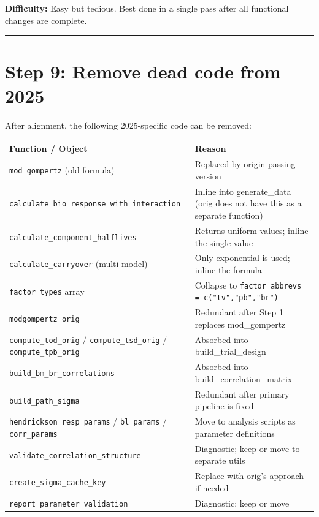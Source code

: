 \documentclass[11pt]{article}
\begin{document}
\textbf{Difficulty:} Easy but tedious. Best done in a single pass after
all functional changes are complete.

\bigskip\noindent\rule{\textwidth}{0.4pt}\bigskip

\section{Step 9: Remove dead code from 2025}

After alignment, the following 2025-specific code can be removed:

\begin{table}[h]
\centering
\small
\begin{tabular}{lp{8cm}}
\toprule
Function / Object & Reason \\
\midrule
\texttt{mod\_gompertz} (old formula) & Replaced by origin-passing version \\
\texttt{calculate\_bio\_response\_with\_interaction} & Inline into generate\_data (orig does not have this as a separate function) \\
\texttt{calculate\_component\_halflives} & Returns uniform values; inline the single value \\
\texttt{calculate\_carryover} (multi-model) & Only exponential is used; inline the formula \\
\texttt{factor\_types} array & Collapse to \texttt{factor\_abbrevs = c("tv","pb","br")} \\
\texttt{modgompertz\_orig} & Redundant after Step 1 replaces mod\_gompertz \\
\texttt{compute\_tod\_orig} / \texttt{compute\_tsd\_orig} / \texttt{compute\_tpb\_orig} & Absorbed into build\_trial\_design \\
\texttt{build\_bm\_br\_correlations} & Absorbed into build\_correlation\_matrix \\
\texttt{build\_path\_sigma} & Redundant after primary pipeline is fixed \\
\texttt{hendrickson\_resp\_params} / \texttt{bl\_params} / \texttt{corr\_params} & Move to analysis scripts as parameter definitions \\
\texttt{validate\_correlation\_structure} & Diagnostic; keep or move to separate utils \\
\texttt{create\_sigma\_cache\_key} & Replace with orig's approach if needed \\
\texttt{report\_parameter\_validation} & Diagnostic; keep or move \\
\bottomrule
\end{tabular}
\end{table}
\end{document}
